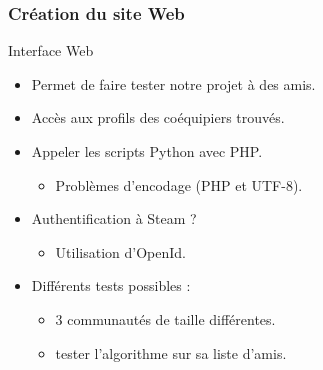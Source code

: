 \documentclass[10pt]{beamer}
\begin{document}
\begin{frame}
 \frametitle{Création du site Web}
 
 \begin{block}{Interface Web}
  \begin{itemize}
   \item Permet de faire tester notre projet à des amis.
   \item Accès aux profils des coéquipiers trouvés.
   \item Appeler les scripts Python avec PHP. 
   \begin{itemize}
    \item Problèmes d'encodage (PHP et UTF-8). 
   \end{itemize}
   \item Authentification à Steam ? 
   \begin{itemize}
    \item Utilisation d'OpenId. 
   \end{itemize}
  \item Différents tests possibles :
  \begin{itemize}
   \item 3 communautés de taille différentes. 
   \item tester l'algorithme sur sa liste d'amis. 
  \end{itemize}
  \end{itemize}
 \end{block}

\end{frame}
\end{document}
